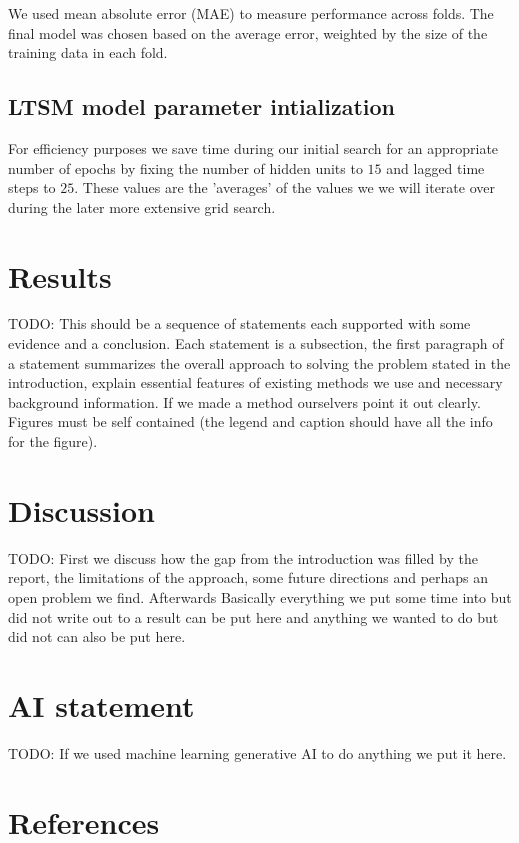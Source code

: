 \documentclass[conference]{IEEEtran}
\begin{document}
We used mean absolute error (MAE) to measure performance across folds. The final model was chosen based 
on the average error, weighted by the size of the training data in each fold.

\subsection{LTSM model parameter intialization}
For efficiency purposes we save time during our initial search for an appropriate number of epochs by 
fixing the number of hidden units to $15$ and lagged time steps to $25$. These values are the 'averages'
of the values we we will iterate over during the later more extensive grid search. 

\section{Results}
TODO: This should be a sequence of statements each supported with some evidence and a conclusion.
Each statement is a subsection, the first paragraph of a statement summarizes the overall approach 
to solving the problem stated in the introduction, explain essential features of existing methods
we use and necessary background information. If we made a method ourselvers point it out clearly. 
Figures must be self contained (the legend and caption should have all the info for the figure).

\section{Discussion}
TODO: First we discuss how the gap from the introduction was filled by the report, the limitations
of the approach, some future directions and perhaps an open problem we find. Afterwards Basically 
everything we put some time into but did not write out to a result can be put here and anything we 
wanted to do but did not can also be put here.

\section*{AI statement}
TODO: If we used machine learning generative AI to do anything we put it here.

\section*{References}
\end{document}
